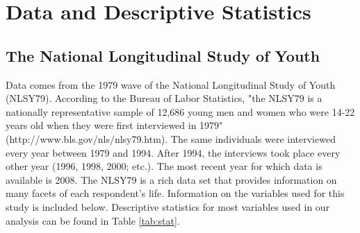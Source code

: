\documentclass[12pt]{report}
\begin{document}
\begin{comment}
The second step involves factor analysis. We analyze the factors that explain the variation in residualized test score, raw test score, and education. We believe that latent ability will be a factor that explains most of the variation in residualized test score, less of the variation in raw test score, and even less of the variation in educational attainment. The factor that meets this criteria for AFQT scores is declared intelligence and the factor that meets this criteria for Rotter scores is declared locus of control.

Compared to the raw test scores, the magnitude of the correlation between these new variables and educational attainment is smaller, but the direction of the relationship between the factors and educational attainment is the same. Additionally, as expected, the correlation between the factor intelligence and the factor locus of control is smaller in magnitude than the correlation between AFQT test scores and Rotter scale scores. While these variables are not the focus of our analysis, using accurate measures of intelligence and locus of control is an important part of getting a clear picture of the relationship between educational attainment and wages, which is central to our analysis.
\end{comment}

\chapter{Data and Descriptive Statistics}

\begin{comment}
Note- this section does not contain a description of the variables in GVD1997, but I think it makes more sense to include it here than in the model section (which is what they do).
\end{comment}

\section*{The National Longitudinal Study of Youth}


Data comes from the 1979 wave of the National Longitudinal Study of Youth (NLSY79). According to the Bureau of Labor Statistics, "the NLSY79 is a nationally representative sample of 12,686 young men and women who were 14-22 years old when they were first interviewed in 1979" (http://www.bls.gov/nls/nlsy79.htm). The same individuals were interviewed every year between 1979 and 1994. After 1994, the interviews took place every other year (1996, 1998, 2000; etc.). The most recent year for which data is available is 2008. The NLSY79 is a rich data set that provides information on many facets of each respondent's life. Information on the variables used for this study is included below. Descriptive statistics for most variables used in our analysis can be found in Table \ref{tab:stat}.
\end{document}
